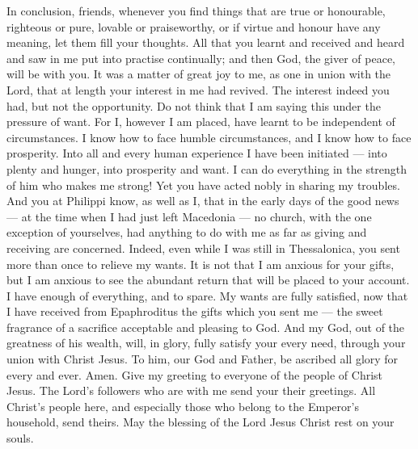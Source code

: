  In conclusion, friends, whenever you find things that are
true or honourable, righteous or pure, lovable or praiseworthy, or if
virtue and honour have any meaning, let them fill your thoughts.
 All that you learnt and received and heard and saw in me
put into practise continually; and then God, the giver of peace, will be
with you.  It was a matter of great joy to me, as one in
union with the Lord, that at length your interest in me had revived. The
interest indeed you had, but not the opportunity.  Do not
think that I am saying this under the pressure of want. For I, however I
am placed, have learnt to be independent of circumstances. 
I know how to face humble circumstances, and I know how to face
prosperity. Into all and every human experience I have been initiated
--- into plenty and hunger, into prosperity and want.  I
can do everything in the strength of him who makes me strong!
 Yet you have acted nobly in sharing my troubles.
 And you at Philippi know, as well as I, that in the early
days of the good news --- at the time when I had just left Macedonia ---
no church, with the one exception of yourselves, had anything to do with
me as far as giving and receiving are concerned.  Indeed,
even while I was still in Thessalonica, you sent more than once to
relieve my wants.  It is not that I am anxious for your
gifts, but I am anxious to see the abundant return that will be placed
to your account. I have enough of everything, and to spare.
 My wants are fully satisfied, now that I have received
from Epaphroditus the gifts which you sent me --- the sweet fragrance of
a sacrifice acceptable and pleasing to God.  And my God,
out of the greatness of his wealth, will, in glory, fully satisfy your
every need, through your union with Christ Jesus.  To him,
our God and Father, be ascribed all glory for every and ever. Amen.
 Give my greeting to everyone of the people of Christ
Jesus. The Lord's followers who are with me send your their greetings.
 All Christ's people here, and especially those who belong
to the Emperor's household, send theirs.  May the blessing
of the Lord Jesus Christ rest on your souls.
